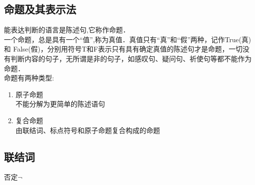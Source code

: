 \subsection{命题及其表示法}



\begin{definition}{}
能表达判断的语言是陈述句,它称作命题．\\ 
 一个命题，总是具有一个“值”,称为真值．真值只有“真”和“假”两种，记作True(真)和 False(假)，分别用符号T和F表示只有具有确定真值的陈述句才是命题，一切没有判断内容的句子，无所谓是非的句子，如感叹句、疑问句、祈使句等都不能作为命题．
\\
命题有两种类型:
\begin{enumerate}
\item 原子命题\\不能分解为更简单的陈述语句
\item 复合命题\\由联结词、标点符号和原子命题复合构成的命题
\end{enumerate} 
\end{definition}


\subsection{联结词}

\begin{definition}{否定$\neg$ }\end{definition} 
